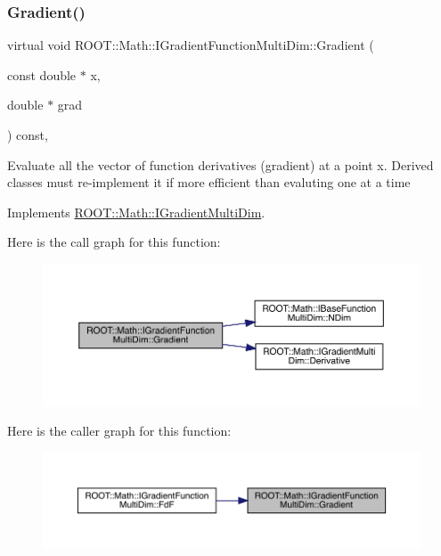 \subsubsection{\texorpdfstring{Gradient()}{Gradient()}\hspace{0.1cm}{\footnotesize\ttfamily [1/2]}}
{\footnotesize\ttfamily virtual void R\+O\+O\+T\+::\+Math\+::\+I\+Gradient\+Function\+Multi\+Dim\+::\+Gradient (\begin{DoxyParamCaption}\item[{const double $\ast$}]{x,  }\item[{double $\ast$}]{grad }\end{DoxyParamCaption}) const\hspace{0.3cm}{\ttfamily [inline]}, {\ttfamily [virtual]}}

Evaluate all the vector of function derivatives (gradient) at a point x. Derived classes must re-\/implement it if more efficient than evaluting one at a time 

Implements \mbox{\hyperlink{classROOT_1_1Math_1_1IGradientMultiDim_ac5785e2df4fa36061bf9ddbb9ce4dde0}{R\+O\+O\+T\+::\+Math\+::\+I\+Gradient\+Multi\+Dim}}.

Here is the call graph for this function\+:
\nopagebreak
\begin{figure}[H]
\begin{center}
\leavevmode
\includegraphics[width=350pt]{da/d1a/classROOT_1_1Math_1_1IGradientFunctionMultiDim_ab65a713d2637c69b334d2119ef4f0e26_cgraph}
\end{center}
\end{figure}
Here is the caller graph for this function\+:\nopagebreak
\begin{figure}[H]
\begin{center}
\leavevmode
\includegraphics[width=350pt]{da/d1a/classROOT_1_1Math_1_1IGradientFunctionMultiDim_ab65a713d2637c69b334d2119ef4f0e26_icgraph}
\end{center}
\end{figure}
\mbox{\label{classROOT_1_1Math_1_1IGradientFunctionMultiDim_ab65a713d2637c69b334d2119ef4f0e26}} 
